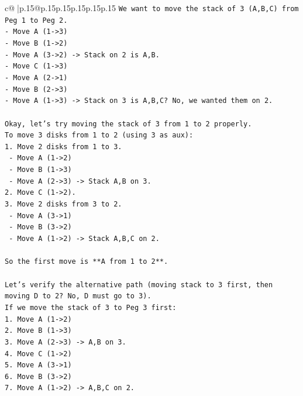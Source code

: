 \documentclass{article}
\begin{document}
{\begin{supertabular}{c@{$\;$}|p{.15\linewidth}@{}p{.15\linewidth}p{.15\linewidth}p{.15\linewidth}p{.15\linewidth}p{.15\linewidth}}
{{{\texttt{We want to move the stack of 3 (A,B,C) from Peg 1 to Peg 2.} \\
\texttt{{-} Move A (1{-}>3)} \\
\texttt{{-} Move B (1{-}>2)} \\
\texttt{{-} Move A (3{-}>2) {-}> Stack on 2 is A,B.} \\
\texttt{{-} Move C (1{-}>3)} \\
\texttt{{-} Move A (2{-}>1)} \\
\texttt{{-} Move B (2{-}>3)} \\
\texttt{{-} Move A (1{-}>3) {-}> Stack on 3 is A,B,C? No, we wanted them on 2.} \\
\\ 
\texttt{Okay, let's try moving the stack of 3 from 1 to 2 properly.} \\
\texttt{To move 3 disks from 1 to 2 (using 3 as aux):} \\
\texttt{1. Move 2 disks from 1 to 3.} \\
\texttt{   {-} Move A (1{-}>2)} \\
\texttt{   {-} Move B (1{-}>3)} \\
\texttt{   {-} Move A (2{-}>3) {-}> Stack A,B on 3.} \\
\texttt{2. Move C (1{-}>2).} \\
\texttt{3. Move 2 disks from 3 to 2.} \\
\texttt{   {-} Move A (3{-}>1)} \\
\texttt{   {-} Move B (3{-}>2)} \\
\texttt{   {-} Move A (1{-}>2) {-}> Stack A,B,C on 2.} \\
\\ 
\texttt{So the first move is **A from 1 to 2**.} \\
\\ 
\texttt{Let's verify the alternative path (moving stack to 3 first, then moving D to 2? No, D must go to 3).} \\
\texttt{If we move the stack of 3 to Peg 3 first:} \\
\texttt{1. Move A (1{-}>2)} \\
\texttt{2. Move B (1{-}>3)} \\
\texttt{3. Move A (2{-}>3) {-}> A,B on 3.} \\
\texttt{4. Move C (1{-}>2)} \\
\texttt{5. Move A (3{-}>1)} \\
\texttt{6. Move B (3{-}>2)} \\
\texttt{7. Move A (1{-}>2) {-}> A,B,C on 2.} \\
}}}
\end{supertabular}}
\end{document}
